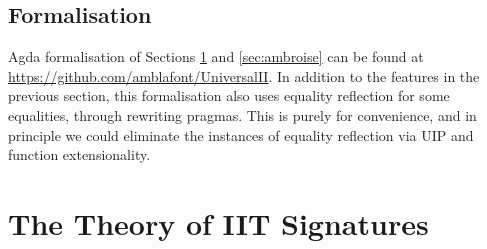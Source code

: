 \documentclass[a4paper,UKenglish,cleveref, autoref]{lipics-v2019}
\begin{document}
\subsection{Formalisation}

Agda formalisation of Sections \ref{sec:theory_of_signatures} and
\ref{sec:ambroise} can be found at
\url{https://github.com/amblafont/UniversalII}. In addition to the features in
the previous section, this formalisation also uses equality reflection for some equalities, through rewriting pragmas\cite{cockxsprinkles}. This is purely for convenience, and in principle we could eliminate the instances of equality reflection via UIP and function extensionality.

\section{The Theory of IIT Signatures}
\label{sec:theory_of_signatures}
\end{document}
